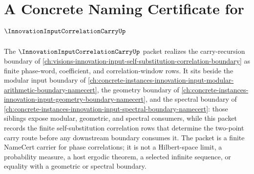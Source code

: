 \chapter{A Concrete Naming Certificate for $\InnovationInputCorrelationCarryUp$}
\label{ch:concrete-instances-innovation-input-correlation-carry-namecert}

The $\InnovationInputCorrelationCarryUp$ packet realizes the carry-recursion boundary of \autoref{ch:visions-innovation-input-self-substitution-correlation-boundary} as finite phase-word, coefficient, and correlation-window rows. It sits beside the modular input boundary of \autoref{ch:concrete-instances-innovation-input-modular-arithmetic-boundary-namecert}, the geometry boundary of \autoref{ch:concrete-instances-innovation-input-geometry-boundary-namecert}, and the spectral boundary of \autoref{ch:concrete-instances-innovation-input-spectral-boundary-namecert}: those siblings expose modular, geometric, and spectral consumers, while this packet records the finite self-substitution correlation rows that determine the two-point carry route before any downstream boundary consumes it. The packet is a finite NameCert carrier for phase correlations; it is not a Hilbert-space limit, a probability measure, a host ergodic theorem, a selected infinite sequence, or equality with a geometric or spectral boundary.

